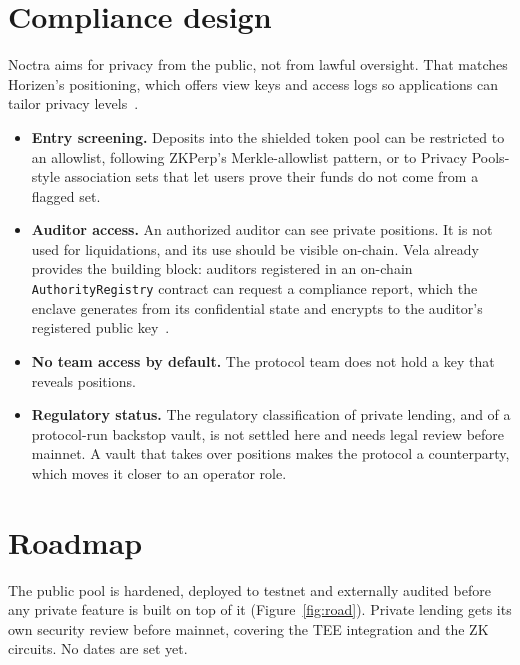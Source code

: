 \documentclass[11pt,a4paper]{article}
\newcommand{\code}[1]{\texttt{#1}}
\begin{document}
\section{Compliance design}
\label{sec:compliance}

Noctra aims for privacy from the public, not from lawful oversight. That matches Horizen's positioning, which
offers view keys and access logs so applications can tailor privacy levels~\citep{horizenroadmap}.

\begin{itemize}
  \item \textbf{Entry screening.} Deposits into the shielded token pool can be restricted to an allowlist,
        following ZKPerp's Merkle-allowlist pattern, or to Privacy Pools-style association sets that let users
        prove their funds do not come from a flagged set.
  \item \textbf{Auditor access.} An authorized auditor can see private positions. It is not used for
        liquidations, and its use should be visible on-chain. Vela already provides the building block:
        auditors registered in an on-chain \code{AuthorityRegistry} contract can request a compliance report,
        which the enclave generates from its confidential state and encrypts to the auditor's registered public
        key~\citep{veladocs}.
  \item \textbf{No team access by default.} The protocol team does not hold a key that reveals positions.
  \item \textbf{Regulatory status.} The regulatory classification of private lending, and of a protocol-run
        backstop vault, is not settled here and needs legal review before mainnet. A vault that takes over
        positions makes the protocol a counterparty, which moves it closer to an operator role.
\end{itemize}

\section{Roadmap}

The public pool is hardened, deployed to testnet and externally audited before any private feature is built on
top of it (Figure~\ref{fig:road}). Private lending gets its own security review before mainnet, covering the TEE
integration and the ZK circuits. No dates are set yet.
\end{document}
